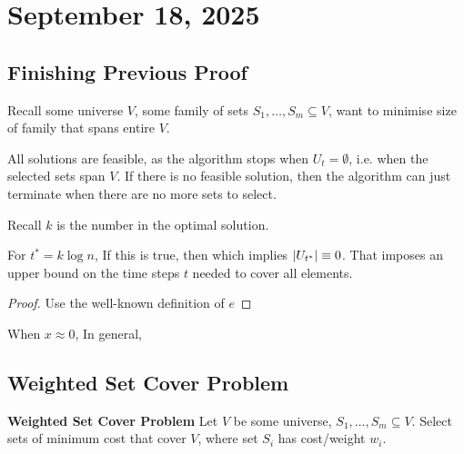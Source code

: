 \section{September 18, 2025}

\subsection{Finishing Previous Proof}

Recall some universe $V$, some family of sets $S_1, \ldots, S_m \subseteq V$, want to minimise size of family that spans entire $V$.

\begin{aside}
    All solutions are feasible, as the algorithm stops when $U_t = \emptyset$, i.e. when the selected sets span $V$. If there is no feasible solution, then the algorithm can just terminate when there are no more sets to select.
\end{aside}

Recall $k$ is the number in the optimal solution.

\begin{lemma}
    For $t^* = k \log n$,
    If this is true, then
    which implies $\abs{U_{t^*}} \equiv 0$. That imposes an upper bound on the time steps $t$ needed to cover all elements.
\end{lemma}

\begin{proof}
    Use the well-known definition of $e$
\end{proof}

\begin{aside}
    When $x \approx 0$,
    In general,
\end{aside}

\subsection{Weighted Set Cover Problem}

\begin{definition}
    \textbf{Weighted Set Cover Problem}
    Let $V$ be some universe, $S_1, \ldots, S_m \subseteq V$. Select sets of minimum cost that cover $V$, where set $S_i$ has cost/weight $w_i$.
\end{definition}

